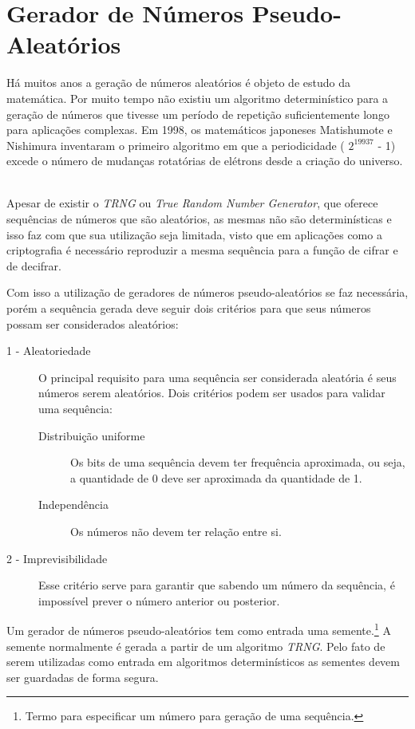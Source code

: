 \chapter{Gerador de Números Pseudo-Aleatórios}
\label{pseudo-random-number-generator}

% 
Há muitos anos a geração de números aleatórios é objeto de estudo da matemática. Por muito tempo não existiu um algoritmo determinístico para a geração de números que tivesse um período de repetição suficientemente longo para aplicações complexas. Em 1998, os matemáticos japoneses Matishumote e Nishimura inventaram o primeiro algoritmo em que a periodicidade ( $2 ^ {19937}$ - 1) excede o número de mudanças rotatórias de elétrons desde a criação do universo. ~\cite{cristophe-diethelm} 

%
Apesar de existir o \textit{TRNG} ou \textit{True Random Number Generator}, que oferece sequências de números que são aleatórios, as mesmas não são determinísticas e isso faz com que sua utilização seja limitada, visto que em aplicações como a criptografia é necessário reproduzir a mesma sequência para a função de cifrar e de decifrar. 

%
Com isso a utilização de geradores de números pseudo-aleatórios se faz necessária, porém a sequência gerada deve seguir dois critérios para que seus números possam ser considerados aleatórios:

\begin{description}
	\item [1 - Aleatoriedade]
	O principal requisito para uma sequência ser considerada aleatória é seus números serem aleatórios. Dois critérios podem ser usados para validar uma sequência:
		\begin{description}
			\item [Distribuição uniforme]
			Os bits de uma sequência devem ter frequência aproximada, ou seja, a quantidade de 0 deve ser aproximada da quantidade de 1.
			\item [Independência]
			Os números não devem ter relação entre si.
			
		\end{description}
	\item [2 - Imprevisibilidade]
	Esse critério serve para garantir que sabendo um número da sequência, é impossível prever o número anterior ou posterior.
\end{description}

Um gerador de números pseudo-aleatórios tem como entrada uma semente.\footnote{Termo para especificar um número para geração de uma sequência.} A semente normalmente é gerada a partir de um algoritmo \textit{TRNG}. Pelo fato de serem utilizadas como entrada em algoritmos determinísticos as sementes devem ser guardadas de forma segura.

